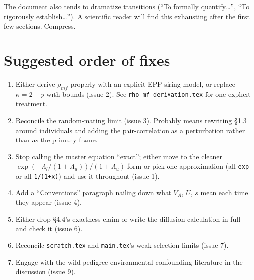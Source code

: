 \documentclass[11pt]{article}
\begin{document}
The document also tends to dramatize transitions (``To formally
quantify\dots'', ``To rigorously establish\dots''). A scientific
reader will find this exhausting after the first few sections.
Compress.

\section{Suggested order of fixes}

\begin{enumerate}
\item Either derive $\rho_{mf}$ properly with an explicit EPP siring
model, or replace $\kappa = 2-p$ with bounds (issue 2). See
\texttt{rho\_mf\_derivation.tex} for one explicit treatment.
\item Reconcile the random-mating limit (issue 3). Probably means
rewriting \S 1.3 around individuals and adding the pair-correlation
as a perturbation rather than as the primary frame.
\item Stop calling the master equation ``exact''; either move to the
cleaner $\exp(-\Lambda_l/(1+\Lambda_u))/(1+\Lambda_u)$ form or pick
one approximation (all-\texttt{exp} or all-\texttt{1/(1+x)}) and use
it throughout (issue 1).
\item Add a ``Conventions'' paragraph nailing down what $V_A$, $U$,
$s$ mean each time they appear (issue 4).
\item Either drop \S 4.4's exactness claim or write the diffusion
calculation in full and check it (issue 6).
\item Reconcile \texttt{scratch.tex} and \texttt{main.tex}'s
weak-selection limits (issue 7).
\item Engage with the wild-pedigree environmental-confounding
literature in the discussion (issue 9).
\end{enumerate}
\end{document}
